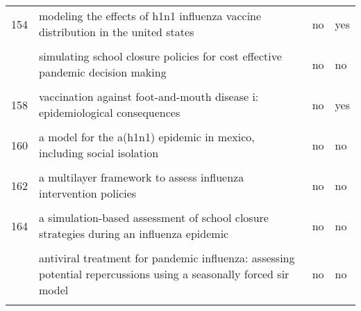 \documentclass[
]{article}
\begin{document}
\begin{landscape}
\begin{longtable}{l>{\raggedright\arraybackslash}p{4cm}l>{\raggedright\arraybackslash}p{4cm}}
154 & modeling the effects of h1n1 influenza vaccine distribution in the united states & no & yes\\
\cellcolor{gray!6}{155} & \cellcolor{gray!6}{modeling the impact of air, sea, and land travel restrictions supplemented by other interventions on the emergence of a new influenza pandemic virus} & \cellcolor{gray!6}{no} & \cellcolor{gray!6}{no}\\
\addlinespace
156 & simulating school closure policies for cost effective pandemic decision making & no & no\\
\cellcolor{gray!6}{157} & \cellcolor{gray!6}{the impact of school closures on pandemic influenza: assessing potential repercussions using a seasonal sir model} & \cellcolor{gray!6}{no} & \cellcolor{gray!6}{no}\\
158 & vaccination against foot-and-mouth disease i: epidemiological consequences & no & yes\\
\cellcolor{gray!6}{159} & \cellcolor{gray!6}{a deterministic resource scheduling model in epidemic control: a case study} & \cellcolor{gray!6}{no} & \cellcolor{gray!6}{yes}\\
160 & a model for the a(h1n1) epidemic in mexico, including social isolation & no & no\\
\addlinespace
\cellcolor{gray!6}{161} & \cellcolor{gray!6}{a model to evaluate mass vaccination against pneumococcus as a countermeasure against pandemic influenza} & \cellcolor{gray!6}{no} & \cellcolor{gray!6}{yes}\\
162 & a multilayer framework to assess influenza intervention policies & no & no\\
\cellcolor{gray!6}{163} & \cellcolor{gray!6}{a note on the use of optimal control on a discrete time model of influenza dynamics} & \cellcolor{gray!6}{no} & \cellcolor{gray!6}{no}\\
164 & a simulation-based assessment of school closure strategies during an influenza epidemic & no & no\\
\cellcolor{gray!6}{165} & \cellcolor{gray!6}{agent-based modeling of the spread of influenza-like illness in an emergency department: a simulation study} & \cellcolor{gray!6}{no} & \cellcolor{gray!6}{no}\\
\addlinespace
166 & antiviral treatment for pandemic influenza: assessing potential repercussions using a seasonally forced sir model & no & no\\
\cellcolor{gray!6}{167} & \cellcolor{gray!6}{can antiviral drugs contain pandemic influenza transmission?} & \cellcolor{gray!6}{no} & \cellcolor{gray!6}{no}\\

\end{longtable}
\end{landscape}
\end{document}
